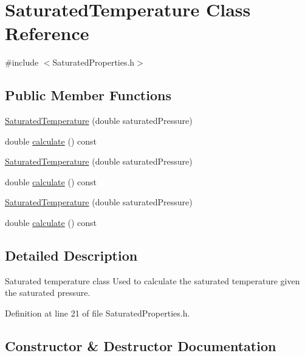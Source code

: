\hypertarget{class_saturated_temperature}{}\section{Saturated\+Temperature Class Reference}
\label{class_saturated_temperature}


{\ttfamily \#include $<$Saturated\+Properties.\+h$>$}

\subsection*{Public Member Functions}
\begin{DoxyCompactItemize}
\item 
\hyperlink{class_saturated_temperature_ae0a4b1684a756ac8f91d3ebb646d6865}{Saturated\+Temperature} (double saturated\+Pressure)
\item 
double \hyperlink{class_saturated_temperature_a4aa0d2a337289dd36f4e063f1f67aaa5}{calculate} () const
\item 
\hyperlink{class_saturated_temperature_ae0a4b1684a756ac8f91d3ebb646d6865}{Saturated\+Temperature} (double saturated\+Pressure)
\item 
double \hyperlink{class_saturated_temperature_a4aa0d2a337289dd36f4e063f1f67aaa5}{calculate} () const
\item 
\hyperlink{class_saturated_temperature_ae0a4b1684a756ac8f91d3ebb646d6865}{Saturated\+Temperature} (double saturated\+Pressure)
\item 
double \hyperlink{class_saturated_temperature_a4aa0d2a337289dd36f4e063f1f67aaa5}{calculate} () const
\end{DoxyCompactItemize}


\subsection{Detailed Description}
Saturated temperature class Used to calculate the saturated temperature given the saturated pressure. 

Definition at line 21 of file Saturated\+Properties.\+h.



\subsection{Constructor \& Destructor Documentation}
\mbox{\label{class_saturated_temperature_ae0a4b1684a756ac8f91d3ebb646d6865}} 
